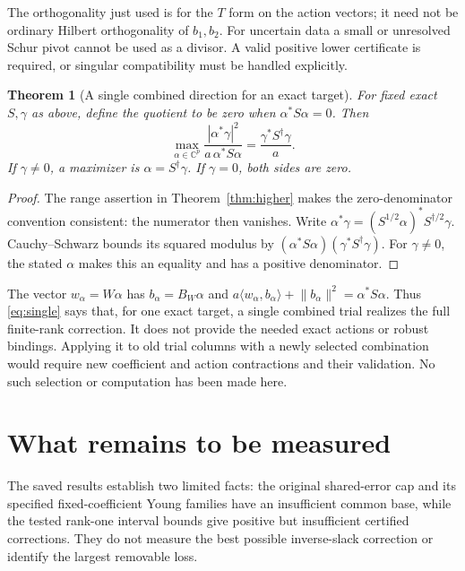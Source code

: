 \documentclass[11pt,a4paper]{article}
\newcommand{\C}{\mathbb C}
\newcommand{\ip}[2]{\langle #1,#2\rangle}
\newcommand{\norm}[1]{\lVert #1\rVert}
\newtheorem{theorem}{Theorem}[section]
\theoremstyle{definition}
\theoremstyle{remark}
\numberwithin{equation}{section}
\begin{document}
The orthogonality just used is for the $T$ form on the action vectors;
it need not be ordinary Hilbert orthogonality of $b_1,b_2$.
For uncertain data a small or unresolved Schur pivot cannot be used as
a divisor. A valid positive lower certificate is required, or singular
compatibility must be handled explicitly.

\begin{theorem}[A single combined direction for an exact target]
\label{thm:singletarget}
For fixed exact $S,\gamma$ as above, define the quotient to be zero
when $\alpha^*S\alpha=0$. Then
\begin{equation}\label{eq:single}
 \max_{\alpha\in\C^p}
 \frac{|\alpha^*\gamma|^2}{a\,\alpha^*S\alpha}
       =\frac{\gamma^*S^\dagger\gamma}{a}.
\end{equation}
If $\gamma\ne0$, a maximizer is $\alpha=S^\dagger\gamma$.
If $\gamma=0$, both sides are zero.
\end{theorem}
\begin{proof}
The range assertion in Theorem~\ref{thm:higher} makes the zero-denominator
convention consistent: the numerator then vanishes.
Write $\alpha^*\gamma=(S^{1/2}\alpha)^*S^{\dagger/2}\gamma$.
Cauchy--Schwarz bounds its squared modulus by
$(\alpha^*S\alpha)(\gamma^*S^\dagger\gamma)$.
For $\gamma\ne0$, the stated $\alpha$ makes this an equality and has a
positive denominator.
\end{proof}

The vector $w_\alpha=W\alpha$ has
$b_\alpha=B_{\!W}\alpha$ and
$a\ip{w_\alpha}{b_\alpha}+\norm{b_\alpha}^2
 =\alpha^*S\alpha$. Thus \eqref{eq:single} says that, for one exact
target, a single combined trial realizes the full finite-rank
correction. It does not provide the needed exact actions or robust
bindings. Applying it to old trial columns with a newly selected
combination would require new coefficient and action contractions and
their validation. No such selection or computation has been made here.

\section{What remains to be measured}\label{sec:ledger}

The saved results establish two limited facts: the original shared-error
cap and its specified fixed-coefficient Young families have an
insufficient common base, while the tested rank-one interval bounds
give positive but insufficient certified corrections. They do not
measure the best possible inverse-slack correction or identify the
largest removable loss.
\end{document}
